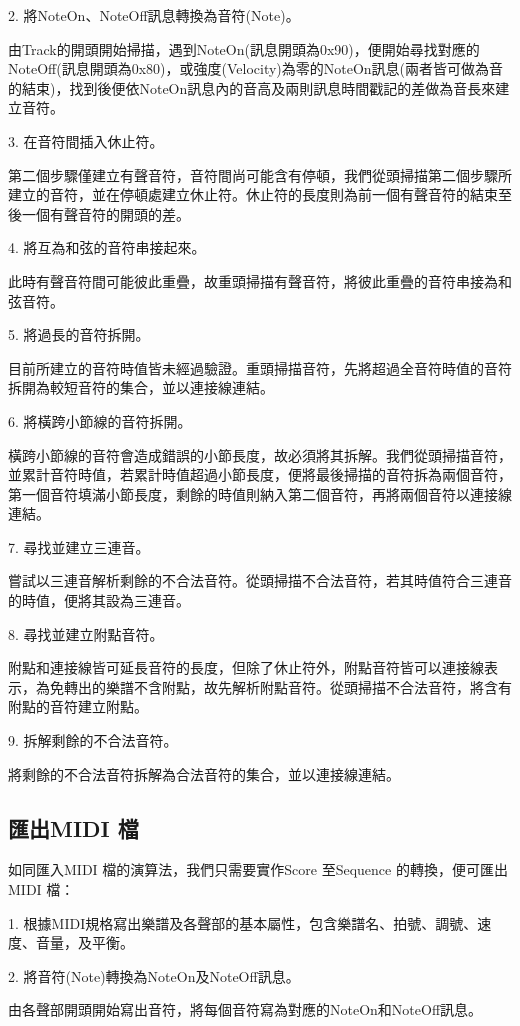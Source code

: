 \documentclass[12pt,a4paper,oneside]{report}
\begin{document}
2. 將NoteOn、NoteOff訊息轉換為音符(Note)。 

由Track的開頭開始掃描，遇到NoteOn(訊息開頭為0x90)，便開始尋找對應的NoteOff(訊息開頭為0x80)，或強度(Velocity)為零的NoteOn訊息(兩者皆可做為音的結束)，找到後便依NoteOn訊息內的音高及兩則訊息時間戳記的差做為音長來建立音符。

3. 在音符間插入休止符。 

第二個步驟僅建立有聲音符，音符間尚可能含有停頓，我們從頭掃描第二個步驟所建立的音符，並在停頓處建立休止符。休止符的長度則為前一個有聲音符的結束至後一個有聲音符的開頭的差。

4. 將互為和弦的音符串接起來。 

此時有聲音符間可能彼此重疊，故重頭掃描有聲音符，將彼此重疊的音符串接為和弦音符。

5. 將過長的音符拆開。 

目前所建立的音符時值皆未經過驗證。重頭掃描音符，先將超過全音符時值的音符拆開為較短音符的集合，並以連接線連結。

6. 將橫跨小節線的音符拆開。

橫跨小節線的音符會造成錯誤的小節長度，故必須將其拆解。我們從頭掃描音符，並累計音符時值，若累計時值超過小節長度，便將最後掃描的音符拆為兩個音符，第一個音符填滿小節長度，剩餘的時值則納入第二個音符，再將兩個音符以連接線連結。

7. 尋找並建立三連音。 

嘗試以三連音解析剩餘的不合法音符。從頭掃描不合法音符，若其時值符合三連音的時值，便將其設為三連音。

8. 尋找並建立附點音符。

附點和連接線皆可延長音符的長度，但除了休止符外，附點音符皆可以連接線表示\cite{theABGuide}，為免轉出的樂譜不含附點，故先解析附點音符。從頭掃描不合法音符，將含有附點的音符建立附點。

9. 拆解剩餘的不合法音符。

將剩餘的不合法音符拆解為合法音符的集合，並以連接線連結。

\subsection{匯出MIDI 檔} %

如同匯入MIDI 檔的演算法，我們只需要實作Score 至Sequence 的轉換，便可匯出MIDI 檔：

1. 根據MIDI規格寫出樂譜及各聲部的基本屬性，包含樂譜名、拍號、調號、速度、音量，及平衡。 

2. 將音符(Note)轉換為NoteOn及NoteOff訊息。 

由各聲部開頭開始寫出音符，將每個音符寫為對應的NoteOn和NoteOff訊息。
\end{document}
